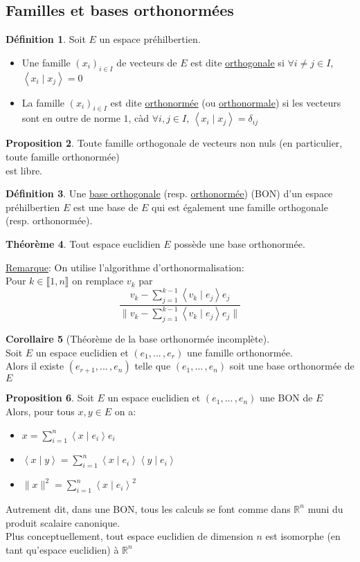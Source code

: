 \documentclass[10pt,a4paper]{article}
\theoremstyle{definition}
\newtheorem{proposition}{Proposition}[section]
\newtheorem{theorem}[proposition]{Théorème}
\newtheorem{corollaire}[proposition]{Corollaire}
\newtheorem{definition}[proposition]{Définition}
\newcommand{\vp}[2]{\left< #1 \mid #2 \right>}
\begin{document}
\subsection{Familles et bases orthonormées}
\begin{definition}
Soit $E$ un espace préhilbertien.
\begin{itemize}
\item Une famille $(x_i)_{i \in I}$ de vecteurs de $E$ est dite \uline{orthogonale} si $\forall i \neq j \in I$, $\vp{x_i}{x_j} = 0$
\item La famille $(x_i)_{i \in I}$ est dite \uline{orthonormée} (ou \uline{orthonormale}) si les vecteurs sont en outre de norme $1$, càd $\forall i, j \in I$, $\vp{x_i}{x_j} = \delta_{ij}$
\end{itemize}
\end{definition}
\begin{proposition}
Toute famille orthogonale de vecteurs non nuls (en particulier, toute famille orthonormée) \\
est libre.
\end{proposition}
\begin{definition}
Une \uline{base orthogonale} (resp. \uline{orthonormée}) (BON) d'un espace préhilbertien $E$ est une base de $E$ qui est également une famille orthogonale (resp. orthonormée).
\end{definition}
\begin{theorem}
Tout espace euclidien $E$ possède une base orthonormée.
\end{theorem}
\noindent \uline{Remarque}: On utilise l'algorithme d'orthonormalisation: \\
Pour $k \in \llbracket 1, n \rrbracket$ on remplace $v_k$ par 
\[ \frac{v_k - \sum\limits_{j = 1}^{k - 1} \vp{v_k}{e_j} e_j}{\lVert v_k - \sum\limits_{j = 1}^{k - 1} \vp{v_k}{e_j} e_j \rVert} \]
\begin{corollaire}[Théorème de la base orthonormée incomplète]
\hfill \\
Soit $E$ un espace euclidien et $(e_1, ...\,, e_r)$ une famille orthonormée. \\
Alors il existe $(e_{r + 1}, ...\,, e_n)$ telle que $(e_1, ...\,, e_n)$ soit une base orthonormée de $E$
\end{corollaire}
\begin{proposition}
Soit $E$ un espace euclidien et $(e_1, ...\,, e_n)$ une BON de $E$ \\
Alors, pour tous $x, y \in E$ on a:
\begin{itemize}
\item $x = \sum\limits_{i = 1}^n \vp{x}{e_i} e_i$
\item $\vp{x}{y} = \sum\limits_{i = 1}^n \vp{x}{e_i} \vp{y}{e_i}$
\item $\lVert x \rVert^2 = \sum\limits_{i = 1}^n \vp{x}{e_i}^2$
\end{itemize}
Autrement dit, dans une BON, tous les calculs se font comme dans $\mathbb{R}^n$ muni du produit scalaire canonique. \\
Plus conceptuellement, tout espace euclidien de dimension $n$ est isomorphe (en tant qu'espace euclidien) à $\mathbb{R}^n$
\end{proposition}
\end{document}
